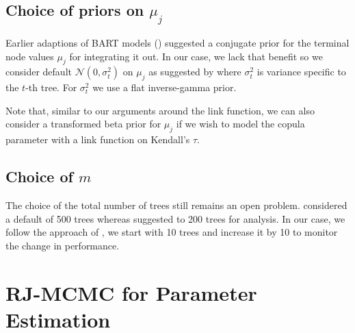 \documentclass{amsart}
\begin{document}
\subsection{Choice of priors on $\mu_j$}
Earlier adaptions of BART models (\citet{chipman2010BART,Sparapani_BART,Murray03042021}) suggested a conjugate prior for the terminal node values $\mu_j$ for integrating it out. In our case, we lack that benefit so we consider default $\mathcal{N}(0,\sigma_{t}^2)$ on $\mu_j$ as suggested by \citet{chipman2010BART,Linero02012025} where $\sigma_{t}^2$ is variance specific to the $t$-th tree. For $\sigma_{t}^2$ we use a flat inverse-gamma prior.

Note that, similar to our arguments around the link function, we can also consider a transformed beta prior \cite{gokhale_prior_cor} for $\mu_j$ if we wish to model the copula parameter with a link function on Kendall's $\tau$.

\subsection{Choice of $m$} The choice of the total number of trees still remains an open problem. \citet{chipman2010BART} considered a default of 500 trees whereas \citet{Linero02012025} suggested to 200 trees for analysis. In our case, we follow the approach of \citet{serafini2024lossbasedpriortreetopologies}, we start with 10 trees and increase it by 10 to monitor the change in performance.

\section{RJ-MCMC for Parameter Estimation}\label{sec:rjmcmc}
\end{document}
